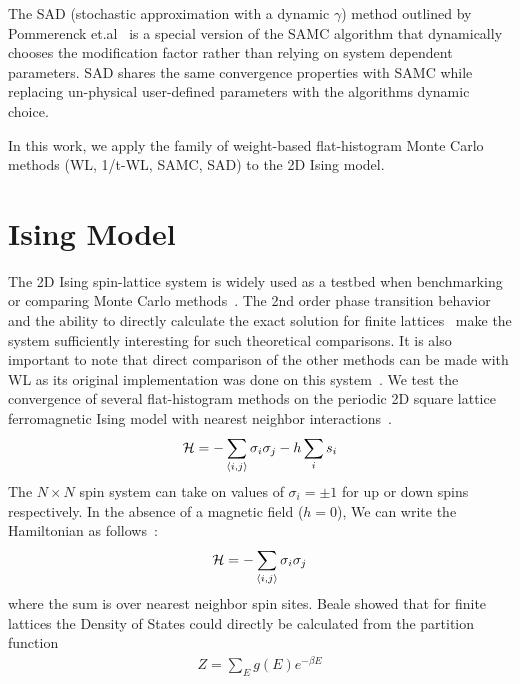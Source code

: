 \documentclass[letterpaper,twocolumn,amsmath,amssymb,pre,aps,10pt]{revtex4-1}
\begin{document}
The SAD (stochastic approximation with a
dynamic $\gamma$) method outlined by Pommerenck
et.al~\cite{pommerenck2020stochastic} is a special version of the SAMC algorithm
that dynamically chooses the modification factor rather than relying on system
dependent parameters. SAD shares the same convergence properties with SAMC while
replacing un-physical user-defined parameters with the algorithms dynamic
choice.

In this work, we apply the family of weight-based flat-histogram Monte
Carlo methods (WL, 1/t-WL, SAMC, SAD) to the 2D Ising model.

\section{Ising Model}
The 2D Ising spin-lattice system is widely used as a testbed when
benchmarking or comparing Monte Carlo
methods~\cite{ferdinand1969bounded, wang1999transition, trebst2004optimizing, barash2019estimating}. The 2nd order
phase transition behavior and the ability to directly calculate the
exact solution for finite lattices~\cite{beale1996exact, haggkvist2004computation} make the
system sufficiently interesting for such theoretical comparisons. It is
also important to note that direct comparison of the other methods can
be made with WL as its original implementation was done on this
system~\cite{wang2001determining,wang2001efficient}.
We test the convergence of several flat-histogram methods
on the periodic 2D square lattice ferromagnetic Ising model with nearest
neighbor interactions~\cite{landau2004new}.
\begin{align}
\mathcal{H} = -\sum_{\braket{i,j}} \sigma_i \sigma_j - h \sum_i s_i
\end{align}
The $N\times N$ spin system can take on values of $\sigma_i = \pm 1$
for up or down spins respectively. In the absence of a magnetic field ($h =
0$), We can write the Hamiltonian as follows~\cite{onsager1944crystal,
kaufman1949crystal}:
\begin{align}
\mathcal{H} = -\sum_{\braket{i,j}} \sigma_i \sigma_j
\end{align}
where the sum is over nearest neighbor spin sites. Beale showed that for finite
lattices the Density of States could directly be calculated from the partition
function~\cite{beale1996exact}
\begin{align}
Z = \sum_E g(E) e^{-{\beta E}}
\end{align}
\end{document}
